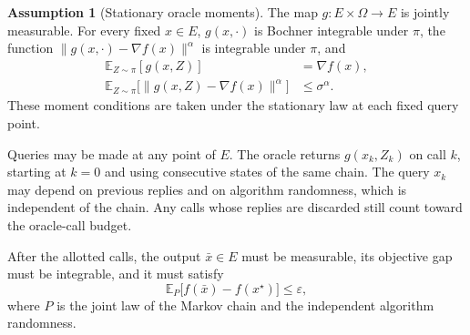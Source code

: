 \documentclass[10pt]{article}
\theoremstyle{definition}
\newtheorem{assumption}{Assumption}
\begin{document}
\begin{assumption}[Stationary oracle moments]
The map $g:E\times\Omega\to E$ is jointly measurable. For every fixed $x\in E$, $g(x,\cdot)$ is Bochner integrable under $\pi$, the function $\|g(x,\cdot)-\nabla f(x)\|^\alpha$ is integrable under $\pi$, and
\[
\begin{aligned}
\mathbb{E}_{Z\sim\pi}[g(x,Z)]&=\nabla f(x),\\
\mathbb{E}_{Z\sim\pi}\bigl[\|g(x,Z)-\nabla f(x)\|^\alpha\bigr]
&\leq\sigma^\alpha.
\end{aligned}
\]
These moment conditions are taken under the stationary law at each fixed query point.
\end{assumption}

Queries may be made at any point of $E$. The oracle returns $g(x_k,Z_k)$ on call $k$, starting at $k=0$ and using consecutive states of the same chain. The query $x_k$ may depend on previous replies and on algorithm randomness, which is independent of the chain. Any calls whose replies are discarded still count toward the oracle-call budget.

After the allotted calls, the output $\bar{x}\in E$ must be measurable, its objective gap must be integrable, and it must satisfy
\[
\mathbb{E}_{P}\bigl[f(\bar{x})-f(x^\star)\bigr]\leq\varepsilon,
\]
where $P$ is the joint law of the Markov chain and the independent algorithm randomness.
\end{document}
